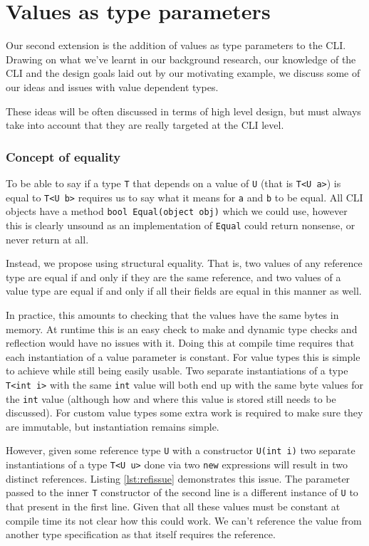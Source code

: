 \chapter{Values as type parameters}

Our second extension is the addition of values as type parameters to the CLI.
Drawing on what we've learnt in our background research, our knowledge of the 
CLI and the design goals laid out by our motivating example, we discuss some of
our ideas and issues with value dependent types.

These ideas will be often discussed in terms of high level design, but 
must always take into account that they are really targeted at the CLI level.

\subsection{Concept of equality}

To be able to say if a type \texttt{T} that depends on a value of
\texttt{U} (that is \texttt{T<U a>}) is equal to \texttt{T<U b>} requires
us to say what it means for \texttt{a} and \texttt{b} to be equal.
All CLI objects have a method \texttt{bool Equal(object obj)} which
we could use, however this is clearly unsound as an implementation
of \texttt{Equal} could return nonsense, or never return at all.

Instead, we propose using structural equality. That is,
two values of any reference type are equal if and only if they are
the same reference, and two values of a value type are equal if and
only if all their fields are equal in this manner as well. 

In practice, this amounts to checking that the values have the same bytes in memory.
At runtime this is an easy check to make and dynamic type checks and reflection would have
no issues with it. Doing this at compile time requires that each instantiation of a value 
parameter is constant. For value types this is simple to achieve while still being easily usable.
Two separate instantiations of a type \texttt{T<int i>} with the same \texttt{int} value will both end 
up with the same byte values for the \texttt{int} value (although how and where this value is stored 
still needs to be discussed). For custom value types some extra work is required to make sure they are
immutable, but instantiation remains simple. 

However, given some reference type \texttt{U} with a constructor \texttt{U(int i)} two separate instantiations of 
a type \texttt{T<U u>} done via two \texttt{new} expressions will result in two distinct references. 
Listing \ref{lst:refissue} demonstrates this issue. The parameter passed to the inner \texttt{T} constructor of the second 
line is a different instance of \texttt{U} to that present in the first line.
Given that all these values must be constant at compile time its not clear how this could work. We can't 
reference the value from another type specification as that itself requires the reference.

